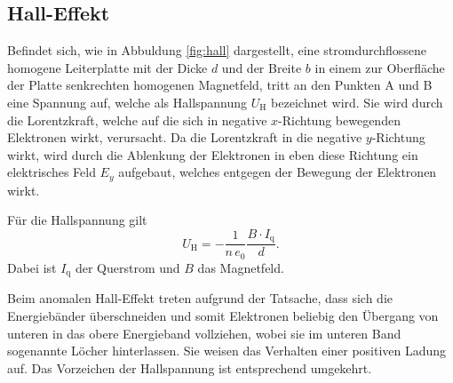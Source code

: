 \subsection{Hall-Effekt}
Befindet sich, wie in Abbuldung \ref{fig:hall} dargestellt, eine stromdurchflossene homogene Leiterplatte mit der Dicke $d$ und der Breite $b$ in einem zur Oberfläche der Platte senkrechten homogenen Magnetfeld, tritt an den Punkten A und B eine Spannung auf, welche als Hallspannung $U_\mathrm{H}$ bezeichnet wird. Sie wird durch die Lorentzkraft, welche auf die sich in negative $x$-Richtung bewegenden Elektronen wirkt, verursacht. Da die Lorentzkraft in die negative $y$-Richtung wirkt, wird durch die Ablenkung der Elektronen in eben diese Richtung ein elektrisches Feld $E_y$ aufgebaut, welches entgegen der Bewegung der Elektronen wirkt.


Für die Hallspannung gilt
\begin{equation}
  U_\mathrm{H} = -\frac{1}{n\,e_0}\frac{B\cdot I_\mathrm{q}}{d}.
\end{equation}
Dabei ist $I_\mathrm{q}$ der Querstrom und $B$ das Magnetfeld.

Beim anomalen Hall-Effekt treten aufgrund der Tatsache, dass sich die Energiebänder überschneiden und somit Elektronen beliebig den Übergang von unteren in das obere Energieband vollziehen, wobei sie im unteren Band sogenannte Löcher hinterlassen. Sie weisen das Verhalten einer positiven Ladung auf. Das Vorzeichen der Hallspannung ist entsprechend umgekehrt.
